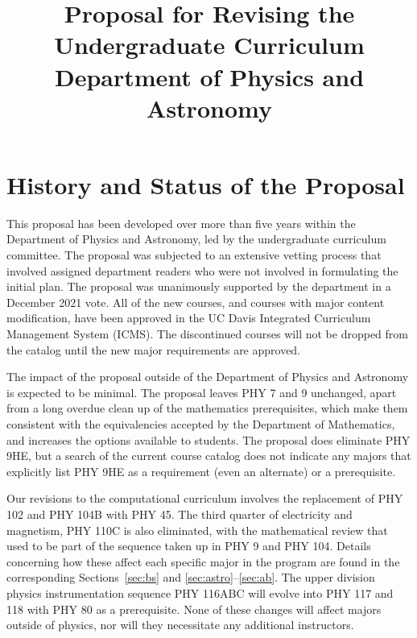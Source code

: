 \documentclass[12pt]{article}
\begin{document}


\title{Proposal for Revising the Undergraduate Curriculum \\
Department of Physics and Astronomy}

\maketitle

\section{History and Status of the Proposal}

This proposal has been developed over more than five years within the
Department of Physics and Astronomy, led by the undergraduate
curriculum committee.  The proposal was subjected to an extensive
vetting process that involved assigned department readers who were not
involved in formulating the initial plan.  The proposal was
unanimously supported by the department in a December 2021 vote.  All
of the new courses, and courses with major content modification, have
been approved in the UC Davis Integrated Curriculum Management System
(ICMS).  The discontinued courses will not be dropped from the catalog until the new major requirements are approved.

The impact of the proposal outside of the Department of Physics and
Astronomy is expected to be minimal. The proposal leaves PHY 7 and 9
unchanged, apart from a long overdue clean up of the mathematics
prerequisites, which make them consistent with the equivalencies
accepted by the Department of Mathematics, and increases the options
available to students.  The proposal does eliminate PHY 9HE, but a
search of the current course catalog does not indicate any majors that
explicitly list PHY 9HE as a requirement (even an alternate) or a
prerequisite.

Our revisions to the computational curriculum involves the replacement
of PHY 102 and PHY 104B with PHY 45.  The third
quarter of electricity and magnetism, PHY 110C is also eliminated,
with the mathematical review that used to be part of the sequence
taken up in PHY 9 and PHY 104.  Details concerning how these affect
each specific major in the program are found in the corresponding
Sections~\ref{sec:bs} and \ref{sec:astro}--\ref{sec:ab}.  The
upper division physics instrumentation sequence PHY 116ABC will evolve
into PHY 117 and 118 with PHY 80 as a prerequisite.  None of these
changes will affect majors outside of physics, nor will they
necessitate any additional instructors.
\end{document}
